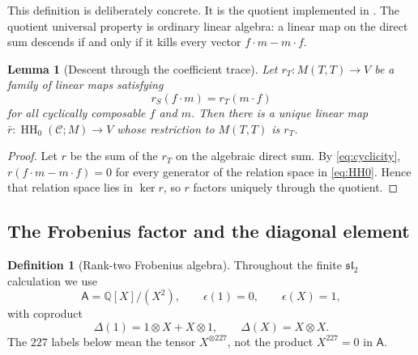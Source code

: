 \documentclass[10pt,reqno]{amsart}
\newtheorem{lemma}[theorem]{Lemma}
\theoremstyle{definition}
\newtheorem{definition}[theorem]{Definition}
\theoremstyle{remark}
\newcommand{\Q}{\mathbb Q}
\newcommand{\HH}{\operatorname{HH}}
\begin{document}
This definition is deliberately concrete.  It is the quotient implemented in
.  The quotient universal property is
ordinary linear algebra: a linear map on the direct sum descends if and only
if it kills every vector $f\cdot m-m\cdot f$.

\begin{lemma}[Descent through the coefficient trace]\label{lem:HH0-descent}
Let $r_T:M(T,T)\to V$ be a family of linear maps satisfying
\begin{equation}\label{eq:cyclicity}
r_S(f\cdot m)=r_T(m\cdot f)
\end{equation}
for all cyclically composable $f$ and $m$.  Then there is a unique linear map
$\bar r:\HH_0(\mathcal C;M)\to V$ whose restriction to $M(T,T)$ is $r_T$.
\end{lemma}

\begin{proof}
Let $r$ be the sum of the $r_T$ on the algebraic direct sum.  By
\cref{eq:cyclicity},
$r(f\cdot m-m\cdot f)=0$ for every generator of the relation space in
\cref{eq:HH0}.  Hence that relation space lies in $\ker r$, so $r$ factors
uniquely through the quotient.
\end{proof}

\subsection{The Frobenius factor and the diagonal element}

\begin{definition}[Rank-two Frobenius algebra]\label{def:frobenius}
Throughout the finite $\mathfrak{sl}_2$ calculation we use
\begin{equation}\label{eq:frob-algebra}
\mathsf A=\Q[X]/(X^2),\qquad
\epsilon(1)=0,\qquad \epsilon(X)=1,
\end{equation}
with coproduct
\begin{equation}\label{eq:frob-coproduct}
\Delta(1)=1\otimes X+X\otimes1,\qquad
\Delta(X)=X\otimes X.
\end{equation}
The $227$ labels below mean the tensor
$X^{\otimes227}$, not the product $X^{227}=0$ in $\mathsf A$.
\end{definition}
\end{document}
